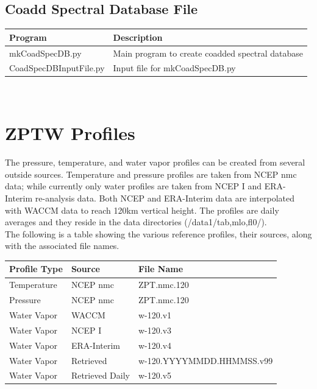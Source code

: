 \documentclass[12pt, letterpaper]{article}
\begin{document}
\subsection{Coadd Spectral Database File}
\label{sec:CSDF}

\begin{tabular}{ l l }
\textbf{Program} & \textbf{Description} \\
\hline
mkCoadSpecDB.py     & Main program to create coadded spectral database\\
CoadSpecDBInputFile.py & Input file for mkCoadSpecDB.py
\end{tabular} \\


\section{ZPTW Profiles}
The pressure, temperature, and water vapor profiles can be created from several outside sources. Temperature and pressure profiles are taken from NCEP nmc data; while currently only water profiles are taken from NCEP I and ERA-Interim re-analysis data. Both NCEP and ERA-Interim data are interpolated with WACCM data to reach 120km vertical height. The profiles are daily averages and they reside in the data directories (/data1/tab,mlo,fl0/).\\

The following is a table showing the various reference profiles, their sources, along with the associated file names.\\

\begin{tabular}{ l l l }
\textbf{Profile Type} & \textbf{Source} & \textbf{File Name} \\
\hline
Temperature   & NCEP nmc          & ZPT.nmc.120 \\
Pressure      & NCEP nmc          & ZPT.nmc.120 \\
Water Vapor   & WACCM             & w-120.v1    \\
Water Vapor   & NCEP I            & w-120.v3    \\
Water Vapor   & ERA-Interim       & w-120.v4    \\
Water Vapor   & Retrieved         & w-120.YYYYMMDD.HHMMSS.v99    \\
Water Vapor   & Retrieved Daily   & w-120.v5    \\
\end{tabular} \\
\end{document}
